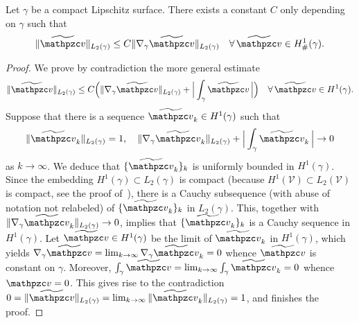 
\begin{lemma}\label{L:Poincare}
Let $\gamma$ be a compact Lipschitz surface. There exists a constant $C$ only depending on $\gamma$ such that
%
\begin{equation}\label{poincare}
\|\widetilde \tv\|_{L_2(\gamma)} \le C \|\nabla_\gamma \widetilde \tv\|_{L_2(\gamma)}
    \quad\forall \, \widetilde \tv\in H^1_\#(\gamma).
\end{equation}
\end{lemma}  
\begin{proof}
We prove by contradiction the more general estimate
% 
\begin{equation}\label{more-general}
\|\wv\|_{L_2(\gamma)} \le C \Big( \|\nabla_\gamma \wv\|_{L_2(\gamma)}
+ \Big| \int_\gamma \wv \, \Big| \Big)
    \quad\forall \, \wv\in H^1(\gamma).
\end{equation}
%
Suppose that there is a sequence $\wv_k\in H^1(\gamma)$ such that
%
\[
\|\wv_k\|_{L_2(\gamma)}=1,\quad
\|\nabla_\gamma \wv_k\|_{L_2(\gamma)} + \Big| \int_\gamma \wv_k \, \Big| \to 0
\]
%
as $k\to\infty$. We deduce that $\{\wv_k\}_k$ is uniformly bounded in $H^1(\gamma)$.
Since the embedding $H^1(\gamma) \subset L_2(\gamma)$ is compact (because $H^1(\mathcal V) \subset L_2(\mathcal V)$ is compact, see the proof of~\cite[Theorem~2.34]{MR681859}), there is a Cauchy subsequence (with abuse of notation not relabeled) of $\{\wv_k\}_k$ in $L_2(\gamma)$. This, together with $\|\nabla_\gamma \wv_k\|_{L_2(\gamma)}\to0$, implies that $\{\wv_k\}_k$ is a Cauchy sequence in $H^1(\gamma)$. Let $\wv\in H^1(\gamma)$ be the limit of $\wv_k$ in $H^1(\gamma)$, which yields $\nabla_\gamma\wv = \lim_{k\to\infty}\nabla_\gamma\wv_k = 0$ whence $\wv$ is constant on $\gamma$. Moreover, $\int_\gamma\wv=\lim_{k\to\infty}\int_\gamma \wv_k = 0$ whence $\tv=0$. This gives rise to the contradiction $0=\|\wv\|_{L_2(\gamma)}=\lim_{k\to\infty}\|\wv_k\|_{L_2(\gamma)}=1$, and finishes the proof.
\end{proof}


